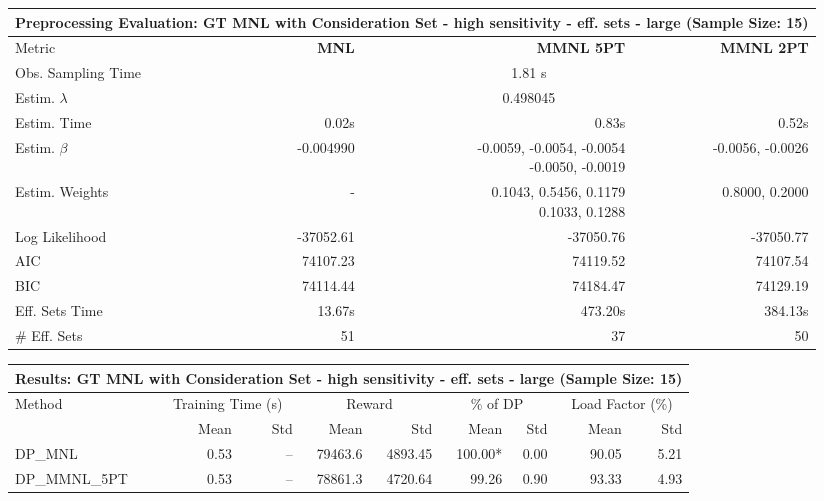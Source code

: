 
\begin{samepage}
\begin{center}
  \small
  \begin{tabular}{l|r|r|r}
    \toprule
    \multicolumn{4}{c}{\textbf{Preprocessing Evaluation: GT MNL with Consideration Set - high sensitivity - eff. sets - large (Sample Size: 15)}} \\
    \midrule
    Metric & \textbf{MNL} & \textbf{MMNL 5PT} & \textbf{MMNL 2PT} \\
    \midrule
    Obs. Sampling Time & \multicolumn{3}{c}{1.81 s} \\
    Estim. $\lambda$ & \multicolumn{3}{c}{0.498045} \\
    Estim. Time & 0.02s & 0.83s & 0.52s \\
    Estim. $\beta$ & -0.004990 & \makecell[tr]{-0.0059, -0.0054, -0.0054 \\ -0.0050, -0.0019} & -0.0056, -0.0026 \\
    Estim. Weights & - & \makecell[tr]{0.1043, 0.5456, 0.1179 \\ 0.1033, 0.1288} & 0.8000, 0.2000 \\
    Log Likelihood & -37052.61 & -37050.76 & -37050.77 \\
    AIC & 74107.23 & 74119.52 & 74107.54 \\
    BIC & 74114.44 & 74184.47 & 74129.19 \\
    Eff. Sets Time & 13.67s & 473.20s & 384.13s \\
    \# Eff. Sets & 51 & 37 & 50 \\
    \bottomrule
  \end{tabular}
\end{center}
\begin{center}
  \small
  \begin{tabular}{l|rr|rr|rr|rr}
    \toprule
    \multicolumn{9}{c}{\textbf{Results: GT MNL with Consideration Set - high sensitivity - eff. sets - large (Sample Size: 15)}} \\
    \midrule
    Method & \multicolumn{2}{c|}{Training Time (s)} & \multicolumn{2}{c|}{Reward} & \multicolumn{2}{c|}{\% of DP} & \multicolumn{2}{c}{Load Factor (\%)} \\
    & Mean & Std & Mean & Std & Mean & Std & Mean & Std \\
    \midrule
    DP\_MNL      &     0.53 &    -- &    79463.6 &    4893.45 & 100.00* &    0.00 &   90.05 &    5.21 \\
    DP\_MMNL\_5PT &     0.53 &    -- &    78861.3 &    4720.64 &   99.26 &    0.90 &   93.33 &    4.93 \\

\end{tabular}
\end{center}
\end{samepage}
